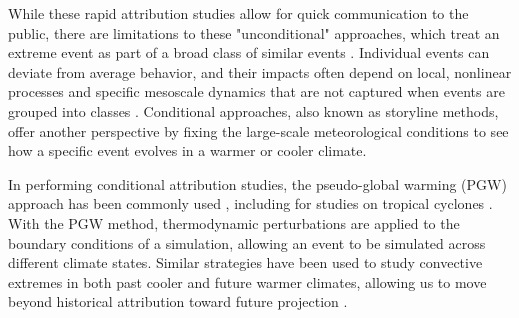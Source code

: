 While these rapid attribution studies allow for quick communication to the public, there are limitations to these "unconditional" approaches, which treat an extreme event as part of a broad class of similar events \citep{lenderink2025pseudo,van2026essential}. Individual events can deviate from average behavior, and their impacts often depend on local, nonlinear processes and specific mesoscale dynamics that are not captured when events are grouped into classes \citep{van2026essential}. Conditional approaches, also known as storyline methods, offer another perspective by fixing the large-scale meteorological conditions to see how a specific event evolves in a warmer or cooler climate.

In performing conditional attribution studies, the pseudo-global warming (PGW) approach has been commonly used \citep{brogli2023pseudo, calvo2026human}, including for studies on tropical cyclones \citep{patricola2018anthropogenic}. With the PGW method, thermodynamic perturbations are applied to the boundary conditions of a simulation, allowing an event to be simulated across different climate states. Similar strategies have been used to study convective extremes in both past cooler and future warmer climates, allowing us to move beyond historical attribution toward future projection \citep{lenderink2025pseudo}.

